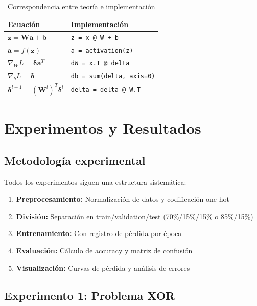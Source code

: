 \documentclass[a4paper,11pt]{article}
\begin{document}
\begin{table}[H]
\centering
\caption{Correspondencia entre teoría e implementación}
\begin{tabular}{p{5cm}p{6cm}}
\toprule
Ecuación & Implementación \\
\midrule
$\mathbf{z} = \mathbf{W}\mathbf{a} + \mathbf{b}$ & \texttt{z = x @ W + b} \\
$\mathbf{a} = f(\mathbf{z})$ & \texttt{a = activation(z)} \\
$\nabla_W L = \boldsymbol{\delta} \mathbf{a}^T$ & \texttt{dW = x.T @ delta} \\
$\nabla_b L = \boldsymbol{\delta}$ & \texttt{db = sum(delta, axis=0)} \\
$\boldsymbol{\delta}^{l-1} = (\mathbf{W}^l)^T \boldsymbol{\delta}^l$ & \texttt{delta = delta @ W.T} \\
\bottomrule
\end{tabular}
\label{tab:teoria_impl}
\end{table}

\newpage
\section{Experimentos y Resultados}

\subsection{Metodología experimental}

Todos los experimentos siguen una estructura sistemática:

\begin{enumerate}
    \item \textbf{Preprocesamiento:} Normalización de datos y codificación one-hot
    \item \textbf{División:} Separación en train/validation/test (70\%/15\%/15\% o 85\%/15\%)
    \item \textbf{Entrenamiento:} Con registro de pérdida por época
    \item \textbf{Evaluación:} Cálculo de accuracy y matriz de confusión
    \item \textbf{Visualización:} Curvas de pérdida y análisis de errores
\end{enumerate}

\subsection{Experimento 1: Problema XOR}
\end{document}
